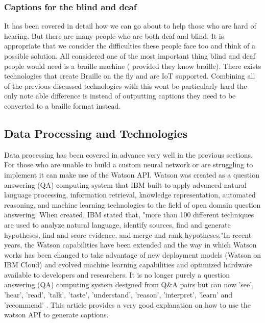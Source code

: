 \documentclass[sigconf]{acmart}
\begin{document}
\subsubsection{Captions for the blind and deaf}
It has been covered in detail how we can go about to help those who are hard of hearing. But there are many people who are both deaf and blind. It is appropriate that we consider the difficulties these people face too and think of a possible solution. All considered one of the most important thing blind and deaf people would need is a braille machine ( provided they know braille). There exists technologies that create Braille on the fly and are IoT supported. Combining all of the previous discussed technologies with this wont be particularly hard the only note able difference is instead of outputting captions they need to be converted to a braille format instead.

\subsection{Data Processing and Technologies}

Data processing has been covered in advance very well in the previous sections. For those who are unable to build a custom neural network or are struggling to implement it can make use of the Watson API. Watson was created as a question answering (QA) computing system that IBM built to apply advanced natural language processing, information retrieval, knowledge representation, automated reasoning, and machine learning technologies to the field of open domain question answering. When created, IBM stated that, "more than 100 different techniques are used to analyze natural language, identify sources, find and generate hypotheses, find and score evidence, and merge and rank hypotheses."In recent years, the Watson capabilities have been extended and the way in which Watson works has been changed to take advantage of new deployment models (Watson on IBM Cloud) and evolved machine learning capabilities and optimized hardware available to developers and researchers. It is no longer purely a question answering (QA) computing system designed from Q&A pairs but can now 'see', 'hear', 'read', 'talk', 'taste', 'understand', 'reason', 'interpret', 'learn' and 'recommend' \cite{Wkipedia2017ibm} . This article \cite{Massachi2017} provides a very good explanation on how to use the watson API to generate captions.
\end{document}
